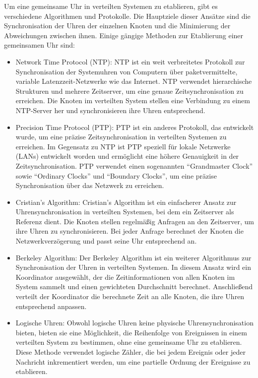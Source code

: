 Um eine gemeinsame Uhr in verteilten Systemen zu etablieren, gibt es verschiedene Algorithmen und Protokolle. Die Hauptziele dieser Ansätze sind die Synchronisation der Uhren der einzelnen Knoten und die Minimierung der Abweichungen zwischen ihnen. Einige gängige Methoden zur Etablierung einer gemeinsamen Uhr sind:
\begin{itemize}
\item Network Time Protocol (NTP): NTP ist ein weit verbreitetes Protokoll zur Synchronisation der Systemuhren von Computern über paketvermittelte, variable Latenzzeit-Netzwerke wie das Internet. NTP verwendet hierarchische Strukturen und mehrere Zeitserver, um eine genaue Zeitsynchronisation zu erreichen. Die Knoten im verteilten System stellen eine Verbindung zu einem NTP-Server her und synchronisieren ihre Uhren entsprechend.
\item Precision Time Protocol (PTP): PTP ist ein anderes Protokoll, das entwickelt wurde, um eine präzise Zeitsynchronisation in verteilten Systemen zu erreichen. Im Gegensatz zu NTP ist PTP speziell für lokale Netzwerke (LANs) entwickelt worden und ermöglicht eine höhere Genauigkeit in der Zeitsynchronisation. PTP verwendet einen sogenannten \enquote{Grandmaster Clock} sowie \enquote{Ordinary Clocks} und \enquote{Boundary Clocks}, um eine präzise Synchronisation über das Netzwerk zu erreichen.
\item Cristian's Algorithm: Cristian's Algorithm ist ein einfacherer Ansatz zur Uhrensynchronisation in verteilten Systemen, bei dem ein Zeitserver als Referenz dient. Die Knoten stellen regelmäßig Anfragen an den Zeitserver, um ihre Uhren zu synchronisieren. Bei jeder Anfrage berechnet der Knoten die Netzwerkverzögerung und passt seine Uhr entsprechend an.
\item Berkeley Algorithm: Der Berkeley Algorithm ist ein weiterer Algorithmus zur Synchronisation der Uhren in verteilten Systemen. In diesem Ansatz wird ein Koordinator ausgewählt, der die Zeitinformationen von allen Knoten im System sammelt und einen gewichteten Durchschnitt berechnet. Anschließend verteilt der Koordinator die berechnete Zeit an alle Knoten, die ihre Uhren entsprechend anpassen.
\item Logische Uhren: Obwohl logische Uhren keine physische Uhrensynchronisation bieten, bieten sie eine Möglichkeit, die Reihenfolge von Ereignissen in einem verteilten System zu bestimmen, ohne eine gemeinsame Uhr zu etablieren. Diese Methode verwendet logische Zähler, die bei jedem Ereignis oder jeder Nachricht inkrementiert werden, um eine partielle Ordnung der Ereignisse zu etablieren.
\end{itemize}

